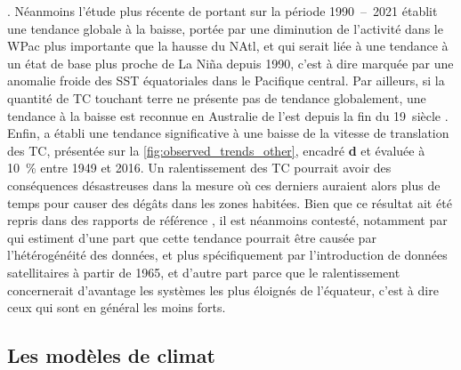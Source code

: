 \documentclass[../main.tex]{subfiles}
\begin{document}
\parencite{webster_changes_2005,maue_recent_2011,wang_climate_2010,seneviratne_weather_2021}. Néanmoins l'étude plus récente de \cite{klotzbach_trends_2022}
portant sur la période \num{1990}~--~\num{2021} établit une tendance globale à la baisse, portée par une diminution de l'activité dans le WPac plus importante
que la hausse du NAtl, et qui serait liée à une tendance à un état de base plus proche de La Niña depuis \num{1990}, c'est à dire marquée par une anomalie
froide des SST équatoriales dans le Pacifique central. Par ailleurs, si la quantité de TC touchant terre ne présente pas de tendance globalement, une tendance à
la baisse est reconnue en Australie de l'est depuis la fin du \num{19}\ieme~siècle \parencite{knutson_tropical_2019,callaghan_variability_2011}. Enfin,
\cite{kossin_global_2018,kossin_reply_2019} a établi une tendance significative à une baisse de la vitesse de translation des TC, présentée sur la
\cref{fig:observed_trends_other}, encadré \textbf{d} et évaluée à \SI{10}{\percent} entre \num{1949} et \num{2016}. Un ralentissement des TC pourrait avoir des
conséquences désastreuses dans la mesure où ces derniers auraient alors plus de temps pour causer des dégâts dans les zones habitées. Bien que ce résultat ait
été repris dans des rapports de référence \parencite{knutson_tropical_2019,seneviratne_weather_2021}, il est néanmoins contesté, notamment par
\cite{lanzante_uncertainties_2019,moon_climate_2019} qui estiment d'une part que cette tendance pourrait être causée par l'hétérogénéité des données, et
plus spécifiquement par l'introduction de données satellitaires à partir de \num{1965}, et d'autre part parce que le ralentissement concernerait d'avantage les
systèmes les plus éloignés de l'équateur, c'est à dire ceux qui sont en général les moins forts.

\subsection{Les modèles de climat}\label{sec:modèles}
\end{document}
